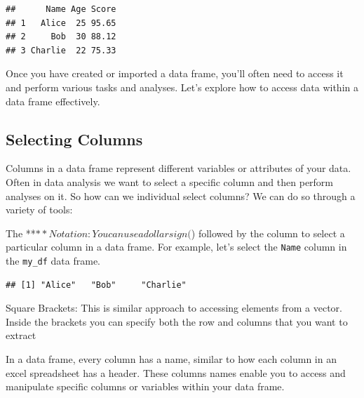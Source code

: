 \documentclass[
]{book}
\newenvironment{Shaded}{\begin{snugshade}}{\end{snugshade}}
\newcommand{\NormalTok}[1]{#1}
\newcommand{\SpecialCharTok}[1]{\textcolor[rgb]{0.81,0.36,0.00}{\textbf{#1}}}
\begin{document}
\begin{verbatim}
##      Name Age Score
## 1   Alice  25 95.65
## 2     Bob  30 88.12
## 3 Charlie  22 75.33
\end{verbatim}

Once you have created or imported a data frame, you'll often need to access it and perform various tasks and analyses. Let's explore how to access data within a data frame effectively.

\hypertarget{selecting-columns}{%
\subsection{Selecting Columns}\label{selecting-columns}}

Columns in a data frame represent different variables or attributes of your data. Often in data analysis we want to select a specific column and then perform analyses on it. So how can we individual select columns? We can do so through a variety of tools:

The **\(** Notation: You can use a dollar sign (\)) followed by the column to select a particular column in a data frame. For example, let's select the \texttt{Name} column in the \texttt{my\_df} data frame.

\begin{Shaded}
\end{Shaded}

\begin{verbatim}
## [1] "Alice"   "Bob"     "Charlie"
\end{verbatim}

Square Brackets: This is similar approach to accessing elements from a vector. Inside the brackets you can specify both the row and columns that you want to extract

In a data frame, every column has a name, similar to how each column in an excel spreadsheet has a header. These columns names enable you to access and manipulate specific columns or variables within your data frame.

  
\end{document}
